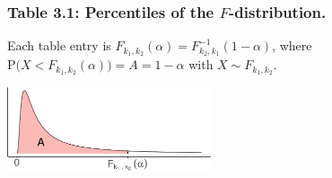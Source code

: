 \documentclass[]{article}
\begin{document}
\hypertarget{table-3.1-percentiles-of-the-f-distribution.}{%
\subsubsection{\texorpdfstring{Table 3.1: Percentiles of the
\(F\)-distribution.}{Table 3.1: Percentiles of the F-distribution.}}\label{table-3.1-percentiles-of-the-f-distribution.}}

\vspace{-0.4em}

Each table entry is
\(F_{k_1,k_2}(\alpha) = F_{k_2,k_1}^{-1}(1-\alpha)\), where
\(\text{P}\big(X < F_{k_1,k_2}(\alpha)\big)=A=1-\alpha\) with
\(X\sim F_{k_1,k_2}\).

\begin{center}\includegraphics[width=6cm]{stat-tables_files/figure-latex/unnamed-chunk-5-1} \end{center}
\vspace{-0.6em}
\end{document}
